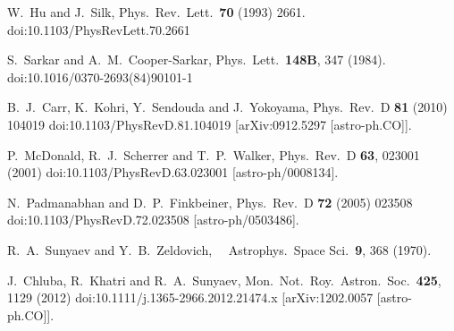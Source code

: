 \documentclass[5p,times]{elsarticle}
\begin{document}
{\begin{thebibliography}{99}
  W.~Hu and J.~Silk,
  Phys.\ Rev.\ Lett.\  {\bf 70} (1993) 2661.
  doi:10.1103/PhysRevLett.70.2661
  
  S.~Sarkar and A.~M.~Cooper-Sarkar,
  Phys.\ Lett.\  {\bf 148B}, 347 (1984).
  doi:10.1016/0370-2693(84)90101-1
  
  B.~J.~Carr, K.~Kohri, Y.~Sendouda and J.~Yokoyama,
  Phys.\ Rev.\ D {\bf 81} (2010) 104019
  doi:10.1103/PhysRevD.81.104019
  [arXiv:0912.5297 [astro-ph.CO]].


  P.~McDonald, R.~J.~Scherrer and T.~P.~Walker,
  Phys.\ Rev.\ D {\bf 63}, 023001 (2001)
  doi:10.1103/PhysRevD.63.023001
  [astro-ph/0008134].

  N.~Padmanabhan and D.~P.~Finkbeiner,
  Phys.\ Rev.\ D {\bf 72} (2005) 023508
  doi:10.1103/PhysRevD.72.023508
  [astro-ph/0503486].


  R.~A.~Sunyaev and Y.~B.~Zeldovich,
  Astrophys.\ Space Sci.\  {\bf 9}, 368 (1970).

  J.~Chluba, R.~Khatri and R.~A.~Sunyaev,
  Mon.\ Not.\ Roy.\ Astron.\ Soc.\  {\bf 425}, 1129 (2012)
  doi:10.1111/j.1365-2966.2012.21474.x
  [arXiv:1202.0057 [astro-ph.CO]].



\end{thebibliography}}
\end{document}

